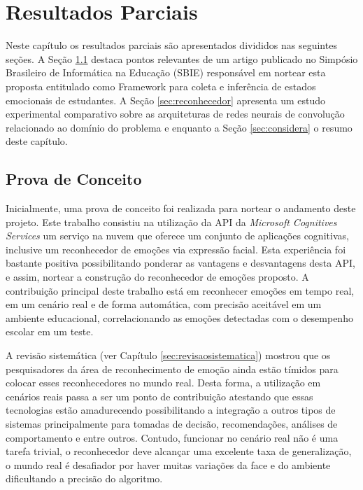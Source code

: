 \chapter{Resultados Parciais}\label{sec:resultados}
Neste capítulo os resultados parciais são apresentados divididos nas seguintes seções. A Seção \ref{sec:prova} destaca pontos relevantes de um artigo publicado no Simpósio Brasileiro de Informática na Educação (SBIE) responsável em nortear esta proposta entitulado como Framework para coleta e inferência de estados emocionais de estudantes. A Seção \ref{sec:reconhecedor} apresenta um estudo experimental comparativo sobre as arquiteturas de redes neurais de convolução relacionado ao domínio do problema e enquanto a Seção \ref{sec:considera} o resumo deste capítulo.   


\section{Prova de Conceito}\label{sec:prova}
Inicialmente, uma prova de conceito foi realizada para nortear o andamento deste projeto. Este trabalho \citep{cruz2017framework} consistiu na utilização da API da \textit{Microsoft Cognitives Services} um serviço na nuvem que oferece um conjunto de aplicações cognitivas, inclusive um reconhecedor de emoções via expressão facial. Esta experiência foi bastante positiva possibilitando ponderar as vantagens e desvantagens desta API, e assim, nortear a construção do reconhecedor de emoções proposto. A contribuição principal deste trabalho está em reconhecer emoções em tempo real, em um cenário real e de forma automática, com precisão aceitável em um ambiente educacional, correlacionando as emoções detectadas com o desempenho escolar em um teste. 

A revisão sistemática (ver Capítulo \ref{sec:revisaosistematica}) mostrou que os pesquisadores da área de reconhecimento de emoção ainda estão tímidos para colocar esses reconhecedores no mundo real. Desta forma, a utilização em cenários reais passa a ser um ponto de contribuição atestando que essas tecnologias estão amadurecendo possibilitando a integração a outros tipos de sistemas principalmente para tomadas de decisão, recomendações, análises de comportamento e entre outros. Contudo, funcionar no cenário real não é uma tarefa trivial, o reconhecedor deve alcançar uma excelente taxa de generalização, o mundo real é desafiador por haver muitas variações da face e do ambiente dificultando a precisão do algoritmo.  


